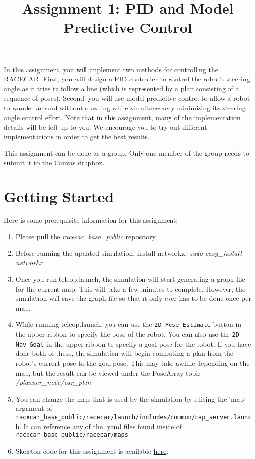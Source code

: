 \documentclass[final]{article}
\title{Assignment 1: PID and Model Predictive Control}
\begin{document}
\maketitle
In this assignment, you will implement two methods for controlling the RACECAR. First, you will design a PID controller to control the robot's steering angle as it tries to follow a line (which is represented by a plan consisting of a sequence of poses). Second, you will use model predicitve control to allow a robot to wander around without crashing while simultaneously minimizing its steering angle control effort. Note that in this assignment, many of the implementation details will be left up to you. We encourage you to try out different implementations in order to get the best results.

This assignment can be done as a group. Only one member of the group needs to submit it to the Canvas dropbox.

\section{Getting Started}
Here is some prerequisite information for this assignment:

\begin{enumerate}
\item Please pull the \textit{racecar\_base\_public} repository
\item Before running the updated simulation, install networkx: \textit{sudo easy\_install networkx}
\item Once you run teleop.launch, the simulation will start generating a graph file for the current map. This will take a few minutes to complete. However, the simulation will save the graph file so that it only ever has to be done once per map.
\item While running teleop.launch, you can use the \texttt{2D Pose Estimate} button in the upper ribbon to specify the pose of the robot. You can also use the \texttt{2D Nav Goal} in the upper ribbon to specify a goal pose for the robot. If you have done both of these, the simulation will begin computing a plan from the robot's current pose to the goal pose. This may take awhile depending on the map, but the result can be viewed under the PoseArray topic \textit{/planner\_node/car\_plan}
\item You can change the map that is used by the simulation by editing the 'map' argument of \texttt{racecar\_base\_public/racecar/launch/includes/common/map\_server.launch}. It can reference any of the .yaml files found inside of \texttt{racecar\_base\_public/racecar/maps}
\item Skeleton code for this assignment is available \href{https://gitlab.cs.washington.edu/uw_racecar/course_materials/lab1}{here}.
\end{enumerate}
\end{document}
